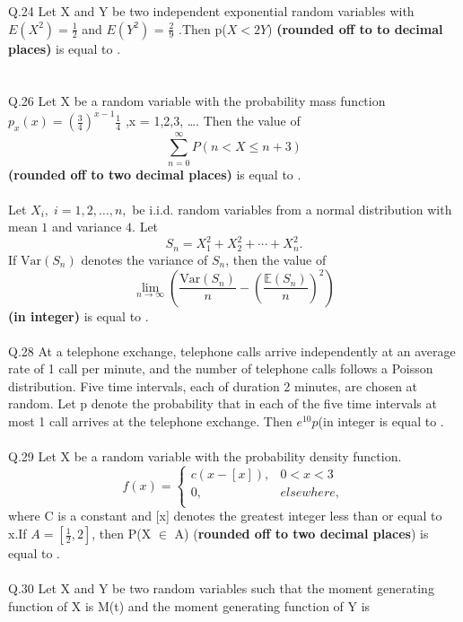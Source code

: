 \documentclass{book}[200pt]
\begin{document}
{Q.24 Let X and Y be two independent exponential random variables with $E(X^2) = \frac{1}{2} $ and $E(Y^2)$ = $\frac{2}{9}$ .Then p($ X < 2Y$) \textbf{(rounded off to to decimal places)} is equal to \underline{\hspace{2cm}}.\\
\\
\\
Q.26 Let X be a random variable with the probability mass function $p_x(x) = (\frac{3}{4})^{x-1}\frac{1}{4}$ ,x = 1,2,3, \dots. Then the value of \[ \sum_{n=0}^{\infty}P(n < X \leq n + 3)
\]
\textbf{(rounded off to two decimal places)} is equal to \underline{\hspace{2cm}} .\\
\\
Let $X_i, \; i = 1, 2, \ldots, n,$ be i.i.d. random variables from a normal distribution 
with mean $1$ and variance $4$. Let 
\[
S_n = X_1^2 + X_2^2 + \cdots + X_n^2.
\]
If $\mathrm{Var}(S_n)$ denotes the variance of $S_n$, then the value of
\[
\lim_{n \to \infty} 
\left(
\frac{\mathrm{Var}(S_n)}{n} 
- 
\left(\frac{\mathbb{E}(S_n)}{n}\right)^2
\right)
\]
\textbf{(in integer)} is equal to \underline{\hspace{2cm}} .\\
\\
Q.28 At a telephone exchange, telephone calls arrive independently at an average rate of
1 call per minute, and the number of telephone calls follows a Poisson distribution.
Five time intervals, each of duration 2 minutes, are chosen at random. Let p denote
the probability that in each of the five time intervals at most 1 call arrives at the
telephone exchange. Then $e^{10}p$(in integer is equal to \underline{\hspace{2cm}}.\\
\\
Q.29 Let X be a random variable with the probability density function.\\
\[ 
f(x) = \begin{cases}
	c(x - [x]), &  0 < x < 3 \\
	0, & elsewhere,\\
	\end{cases}
\]
where C is a constant and [x] denotes the greatest integer less than or equal to x.If $A = [\frac{1}{2},2]$, then P(X $\in$ A) (\textbf{rounded off to two decimal  places}) is equal to \underline{\hspace{2cm}}.\\
\\
Q.30 Let X and Y be two random variables such that the moment generating function of X is M(t) and the moment generating function of Y is \[
\]}
\end{document}
